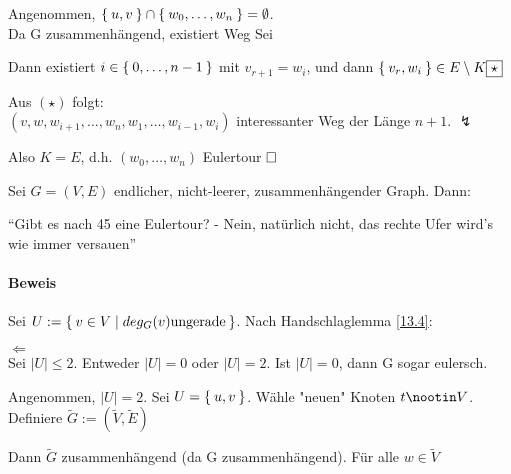 \documentclass{../../meta/tudscript}
\begin{document}

Angenommen, $\Set{u, v} \cap \Set{w_0, \ldots, w_n} = \emptyset$. \\
Da G zusammenhängend, existiert Weg 
Sei 

Dann existiert $i \in \Set{0, \ldots, n-1}$ mit $v_{r + 1} = w_i$, und
dann $\Set{v_r, w_i} \in E \setminus K \hfill\boxed{\star}$ 

Aus $(\star)$ folgt: \\
$(v, w, w_{i+1}, \ldots, w_n, w_1, \ldots, w_{i-1}, w_i)$
interessanter Weg der Länge $n+1$. $\lightning$

Also $K = E$, d.h. $(w_0, \ldots, w_n)$ Eulertour $\hfill\square$

Sei $G = (V, E)$ endlicher, nicht-leerer, zusammenhängender Graph. Dann:


\enquote{Gibt es nach 45 eine Eulertour? - Nein, natürlich nicht, das rechte Ufer wird's wie immer versauen}

\paragraph{Beweis}
Sei $U := \Set{v \in V \mid deg_G (v) \text{ungerade}}$. Nach Handschlaglemma \ref{13.4}:


\underline{$\Leftarrow$} \\
Sei $|U| \leq 2$. Entweder $|U| = 0$ oder $|U| = 2$. Ist $|U| = 0$, dann G sogar eulersch.

Angenommen, $|U| = 2$. Sei $U = \Set{u, v}$. Wähle "neuen" Knoten $t \nootin V$.
Definiere $\tilde{G} := (\tilde{V}, \tilde{E})$

Dann $\tilde{G}$ zusammenhängend (da G zusammenhängend). Für alle $w \in \tilde{V}$
\end{document}
